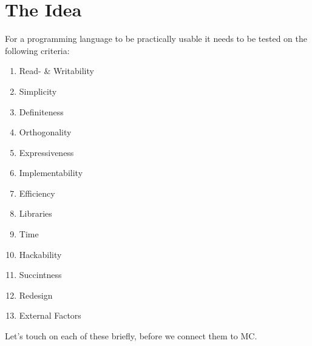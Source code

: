\section{The Idea}\label{sec:criteria}

For a programming language to be practically usable it needs to be tested on the following criteria\cite{khedker1997makes,graham2004hackers}:

\begin{multicols}{3}
   \begin{enumerate}
      \item Read- \& Writability
      \item Simplicity
      \item Definiteness
      \item Orthogonality
      \item Expressiveness
      \item Implementability
      \item Efficiency
      \item Libraries
      \item Time
      \item Hackability
      \item Succintness
      \item Redesign
      \item External Factors
   \end{enumerate}
\end{multicols}
Let's touch on each of these briefly, before we connect them to MC.

